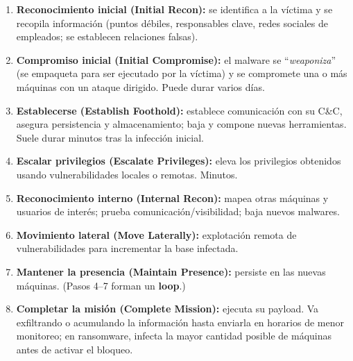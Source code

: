 \documentclass[../main.tex]{subfiles}
\begin{document}
\begin{enumerate}[noitemsep]
  \item \textbf{Reconocimiento inicial (Initial Recon):} se identifica a la víctima
        y se recopila información (puntos débiles, responsables clave, redes sociales
        de empleados; se establecen relaciones falsas).
  \item \textbf{Compromiso inicial (Initial Compromise):} el malware se
        ``\textit{weaponiza}'' (se empaqueta para ser ejecutado por la víctima) y se
        compromete una o más máquinas con un ataque dirigido. Puede durar varios días.
  \item \textbf{Establecerse (Establish Foothold):} establece comunicación con su
        C\&C, asegura persistencia y almacenamiento; baja y compone nuevas
        herramientas. Suele durar minutos tras la infección inicial.
  \item \textbf{Escalar privilegios (Escalate Privileges):} eleva los privilegios
        obtenidos usando vulnerabilidades locales o remotas. Minutos.
  \item \textbf{Reconocimiento interno (Internal Recon):} mapea otras máquinas y
        usuarios de interés; prueba comunicación/visibilidad; baja nuevos malwares.
  \item \textbf{Movimiento lateral (Move Laterally):} explotación remota de
        vulnerabilidades para incrementar la base infectada.
  \item \textbf{Mantener la presencia (Maintain Presence):} persiste en las nuevas
        máquinas. (Pasos 4--7 forman un \textbf{loop}.)
  \item \textbf{Completar la misión (Complete Mission):} ejecuta su payload. Va
        exfiltrando o acumulando la información hasta enviarla en horarios de menor
        monitoreo; en ransomware, infecta la mayor cantidad posible de máquinas antes
        de activar el bloqueo.
\end{enumerate}
\end{document}
